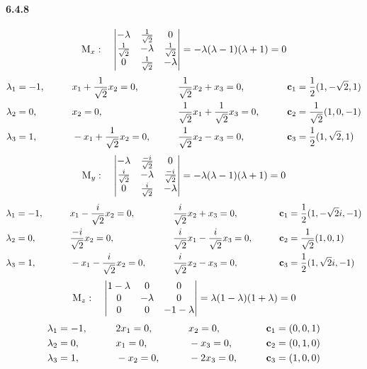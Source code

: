 \documentclass[a4paper]{article}
\begin{document}
\paragraph{6.4.8}
\renewcommand{\arraystretch}{1.5}
\[
\mathrm{M}_x:\quad
\begin{vmatrix}
 -\lambda&\frac{1}{\sqrt{2}} &0 \\
 \frac{1}{\sqrt{2}} & -\lambda&\frac{1}{\sqrt{2}} \\
 0 &\frac{1}{\sqrt{2}} &-\lambda
\end{vmatrix}=
-\lambda(\lambda-1)(\lambda+1)=0
\]
\begin{alignat*}{4}
    & \lambda_1=-1 ,\qquad && x_1+\frac{1}{\sqrt{2}}x_2=0,\qquad && \frac{1}{\sqrt{2}}x_2+x_3=0,\qquad && \mathbf{c}_1=\frac{1}{2}(1,-\sqrt{2},1) \\
    & \lambda_2=0 ,\qquad && x_2=0,\qquad && \frac{1}{\sqrt{2}}x_1+\frac{1}{\sqrt{2}}x_3=0,\qquad && \mathbf{c}_2=\frac{1}{\sqrt{2}}(1,0,-1)\\
    & \lambda_3=1 ,\qquad && -x_1+\frac{1}{\sqrt{2}}x_2=0,\qquad && \frac{1}{\sqrt{2}}x_2-x_3=0,\qquad && \mathbf{c}_3=\frac{1}{2}(1,\sqrt{2},1) \\
\end{alignat*}
\[
\mathrm{M}_y:\quad
\begin{vmatrix}
 -\lambda&\frac{-i}{\sqrt{2}} &0 \\
 \frac{i}{\sqrt{2}} & -\lambda&\frac{-i}{\sqrt{2}} \\
 0 &\frac{i}{\sqrt{2}} &-\lambda
\end{vmatrix}=
-\lambda(\lambda-1)(\lambda+1)=0
\]
\begin{alignat*}{4}
    & \lambda_1=-1 ,\qquad && x_1-\frac{i}{\sqrt{2}}x_2=0,\qquad && \frac{i}{\sqrt{2}}x_2+x_3=0,\qquad && \mathbf{c}_1=\frac{1}{2}(1,-\sqrt{2}i,-1) \\
    & \lambda_2=0 ,\qquad && \frac{-i}{\sqrt{2}}x_2=0,\qquad && \frac{i}{\sqrt{2}}x_1-\frac{i}{\sqrt{2}}x_3=0,\qquad && \mathbf{c}_2=\frac{1}{\sqrt{2}}(1,0,1)\\
    & \lambda_3=1 ,\qquad && -x_1-\frac{i}{\sqrt{2}}x_2=0,\qquad && \frac{i}{\sqrt{2}}x_2-x_3=0,\qquad && \mathbf{c}_3=\frac{1}{2}(1,\sqrt{2}i,-1) \\
\end{alignat*}
\[
\mathrm{M}_z:\quad
\begin{vmatrix}
 1-\lambda&0 &0 \\
 0 & -\lambda&0 \\
 0 &0 &-1-\lambda
\end{vmatrix}=
\lambda(1-\lambda)(1+\lambda)=0
\]
\begin{alignat*}{4}
    & \lambda_1=-1 ,\qquad && 2x_1=0,\qquad && x_2=0,\qquad && \mathbf{c}_1=(0,0,1) \\
    & \lambda_2=0 ,\qquad && x_1=0,\qquad && -x_3=0,\qquad && \mathbf{c}_2=(0,1,0)\\
    & \lambda_3=1 ,\qquad && -x_2=0,\qquad && -2x_3=0,\qquad && \mathbf{c}_3=(1,0,0) \\
\end{alignat*}
\end{document}
